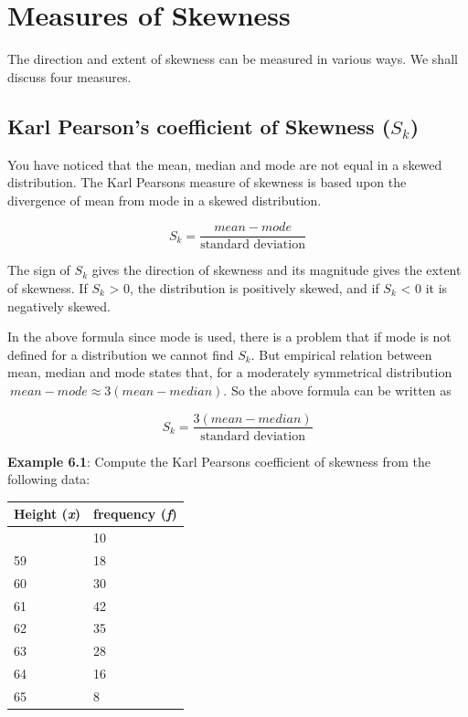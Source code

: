 \documentclass[
]{book}
\begin{document}
\hypertarget{measures-of-skewness}{%
\section{Measures of Skewness}\label{measures-of-skewness}}

The direction and extent of skewness can be measured in various ways. We
shall discuss four measures.

\hypertarget{karl-pearsons-coefficient-of-skewness-s_k}{%
\subsection{\texorpdfstring{Karl Pearson's coefficient of Skewness (\textbf{\(S_{k}\)})}{Karl Pearson's coefficient of Skewness (S\_\{k\})}}\label{karl-pearsons-coefficient-of-skewness-s_k}}

You have noticed that the mean, median and mode are not equal in a
skewed distribution. The Karl Pearson\textquotesingle s measure of skewness is based
upon the divergence of mean from mode in a skewed distribution.

\[S_{k} = \frac{mean - mode}{\text{standard deviation}}\]

The sign of \(S_{k}\) gives the direction of skewness and its magnitude
gives the extent of skewness. If \(S_{k}\) \textgreater{} 0, the distribution is
positively skewed, and if \(S_{k}\) \textless{} 0 it is negatively skewed.

In the above formula since mode is used, there is a problem that if mode
is not defined for a distribution we cannot find \(S_{k}\). But empirical
relation between mean, median and mode states that, for a moderately
symmetrical distribution\(\ mean - mode \approx 3(mean - median)\). So the
above formula can be written as

\[S_{k} = \frac{3(mean - median)}{\text{standard deviation}}\]

\textbf{Example 6.1}: Compute the Karl Pearson\textquotesingle s coefficient of skewness from
the following data:

\begin{longtable}[]{@{}ll@{}}
\toprule\noalign{}
Height (\emph{x}) & frequency (\emph{f}) \\
\midrule\noalign{}
\endhead
\bottomrule\noalign{}
\endlastfoot
58 & 10 \\
59 & 18 \\
60 & 30 \\
61 & 42 \\
62 & 35 \\
63 & 28 \\
64 & 16 \\
65 & 8 \\
\end{longtable}
\end{document}
